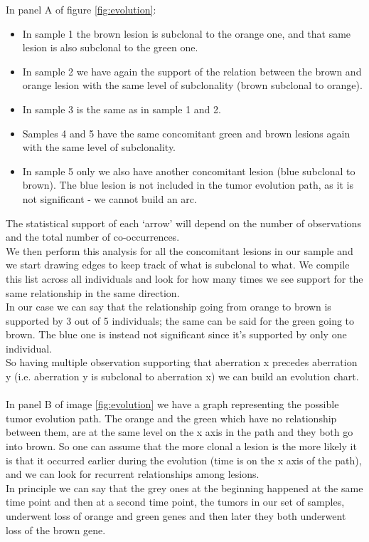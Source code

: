 In panel A of figure \ref{fig:evolution}:
\begin{itemize}
\item In sample 1 the brown lesion is subclonal to the orange one, and that same lesion is also subclonal to the green one.
\item In sample 2 we have again the support of the relation between the brown and orange lesion with the same level of subclonality (brown subclonal to orange).
\item In sample 3 is the same as in sample 1 and 2.
\item Samples 4 and 5 have the same concomitant green and brown lesions again with the same level of subclonality.
\item In sample 5 only we also have another concomitant lesion (blue subclonal to brown). The blue lesion is not included in the tumor evolution path, as it is not significant - we cannot build an arc.
\end{itemize}

The statistical support of each ‘arrow’ will depend on the number of observations and the total number of co-occurrences.
\\
We then perform this analysis for all the concomitant lesions in our sample and we start drawing edges to keep track of what is subclonal to what. We compile this list across all individuals and look for how many times we see support for the same relationship in the same direction.
\\
In our case we can say that the relationship going from orange to brown is supported by 3 out of 5 individuals; the same can be said for the green going to brown. The blue one is instead not significant since it's supported by only one individual.
\\
So having multiple observation supporting that aberration x precedes aberration y (i.e. aberration y is subclonal to aberration x) we can build an evolution chart.
\\
\\
In panel B of image \ref{fig:evolution} we have a graph representing the possible tumor evolution path.
The orange and the green which have no relationship between them, are at the same level on the x axis in the path and they both go into brown. So one can assume that the more clonal a lesion is the more likely it is that it occurred earlier during the evolution (time is on the x axis of the path), and we can look for recurrent relationships among lesions.
\\
In principle we can say that the grey ones at the beginning happened at the same time point and then at a second time point, the tumors in our set of samples, underwent loss of orange and green genes and then later they both underwent loss of the brown gene.

